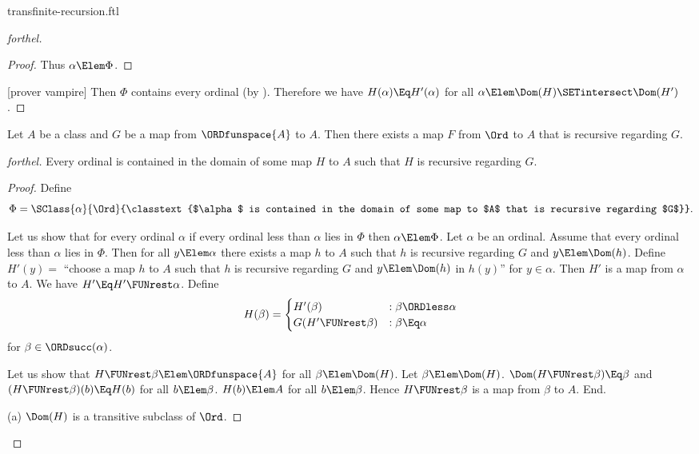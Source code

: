 \documentclass{stex}
\begin{document}
\begin{smodule}{transfinite-recursion.ftl}
\begin{proof}[forthel]
\begin{proof}
    Thus $\alpha \Elem \Phi$.
  \end{proof}

  [prover vampire]
  Then $\Phi$ contains every ordinal (by ).
  Therefore we have $H(\alpha) \Eq H'(\alpha)$ for all $\alpha \Elem \Dom(H) \SETintersect \Dom(H')$.
\end{proof}

\begin{theorem}[forthel,title=Transfinite Recursion: Existence]
  Let $A$ be a class and $G$ be a map from $\ORDfunspace{A}$ to $A$.
  Then there exists a map $F$ from $\Ord$ to $A$ that is recursive regarding $G$.
\end{theorem}
\begin{proof}[forthel]
  Every ordinal is contained in the domain of some map $H$ to $A$ such that $H$ is recursive regarding $G$.
  \begin{proof}
    Define \[ \Phi = \SClass{\alpha}{\Ord}{\classtext{$\alpha$ is contained in the domain of some map to $A$ that is recursive regarding $G$}}. \]

    Let us show that for every ordinal $\alpha$ if every ordinal less than $\alpha$ lies in $\Phi$ then $\alpha \Elem \Phi$.
      Let $\alpha$ be an ordinal.
      Assume that every ordinal less than $\alpha$ lies in $\Phi$.
      Then for all $y \Elem \alpha$ there exists a map $h$ to $A$ such that $h$ is recursive regarding $G$ and $y \Elem \Dom(h)$.
      Define $H'(y) =$ ``choose a map $h$ to $A$ such that $h$ is recursive regarding $G$ and $y \Elem \Dom(h)$ in $h(y)$'' for $y \in \alpha$.
      Then $H'$ is a map from $\alpha$ to $A$.
      We have $H' \Eq H' \FUNrest \alpha$.
      Define \[ H(\beta) =
        \begin{cases}
          H'(\beta)                 & : \beta \ORDless \alpha \\
          G(H' \FUNrest \beta)  & : \beta \Eq \alpha
        \end{cases} \]
      for $\beta \in \ORDsucc(\alpha)$.
      
      Let us show that $H \FUNrest \beta \Elem \ORDfunspace{A}$ for all $\beta \Elem \Dom(H)$.
        Let $\beta \Elem \Dom(H)$.
        $\Dom(H \FUNrest \beta) \Eq \beta$ and $(H \FUNrest \beta)(b) \Eq H(b)$ for all $b \Elem \beta$.
        $H(b) \Elem A$ for all $b \Elem \beta$.
        Hence $H \FUNrest \beta$ is a map from $\beta$ to $A$.
      End.

      (a) $\Dom(H)$ is a transitive subclass of $\Ord$.


\end{proof}
\end{proof}
\end{smodule}
\end{document}
